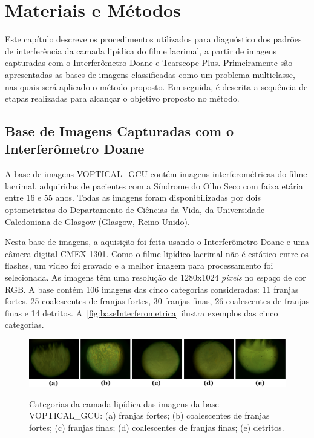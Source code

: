 \chapter{Materiais e Métodos}
\label{metodologia_ref}
\phantom{0}
  
Este capítulo descreve os procedimentos utilizados para diagnóstico dos padrões de interferência da camada lipídica do filme lacrimal, a partir de imagens capturadas com o Interferômetro Doane e Tearscope Plus. Primeiramente são apresentadas as bases de imagens classificadas como um problema multiclasse, nas quais será aplicado o método proposto. Em seguida, é descrita a sequência de etapas realizadas para alcançar o objetivo proposto no método.

\section{Base de Imagens Capturadas com o Interferômetro Doane}
\label{sec:metodoBaseInterferometrica}

A base de imagens VOPTICAL\_GCU \cite{voptical_gcuvarpa2013} contém imagens interferométricas do filme lacrimal, adquiridas de pacientes com a Síndrome do Olho Seco com faixa etária entre 16 e 55 anos. Todas as imagens foram disponibilizadas por dois optometristas do Departamento de Ciências da Vida, da Universidade Caledoniana de Glasgow (Glasgow, Reino Unido).

Nesta base de imagens, a aquisição foi feita usando o Interferômetro Doane \cite{doane1989instrument} e uma câmera digital CMEX-1301. Como o filme lipídico lacrimal não é estático entre os flashes, um vídeo foi gravado e a melhor imagem para processamento foi selecionada. As imagens têm uma resolução de 1280x1024 \textit{pixels} no espaço de cor RGB. A base contém 106 imagens das cinco categorias consideradas: 11 franjas fortes, 25 coalescentes de franjas fortes, 30 franjas finas, 26 coalescentes de franjas finas e 14 detritos. A~\autoref{fig:baseInterferometrica} ilustra exemplos das cinco categorias.

\begin{figure}[ht!]
    \centering
    \caption{Categorias da camada lipídica das imagens da base VOPTICAL\_GCU: (a) franjas fortes; (b) coalescentes de franjas fortes; (c) franjas finas; (d) coalescentes de franjas finas; (e) detritos.}
    \includegraphics[width=15.8cm]{figs/BaseVOPTICAL.png}
    \label{fig:baseInterferometrica}
\end{figure}

